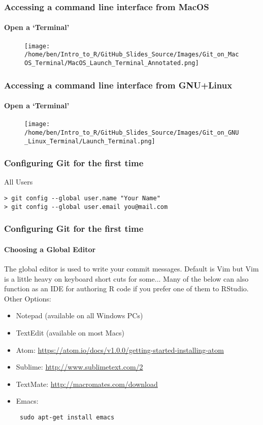 \documentclass[xcolor=dvipsnames]{beamer}
\begin{document}
\begin{frame}
\frametitle{Accessing a command line interface from MacOS}
\framesubtitle{Open a `Terminal'}
\begin{center}
\begin{figure}
\texttt{[image: /home/ben/Intro\_to\_R/GitHub\_Slides\_Source/Images/Git\_on\_MacOS\_Terminal/MacOS\_Launch\_Terminal\_Annotated.png]} 
\end{figure}
\end{center}
\end{frame}

\begin{frame}
\frametitle{Accessing a command line interface from GNU+Linux}
\framesubtitle{Open a `Terminal'}
\begin{center}
\begin{figure}
\texttt{[image: /home/ben/Intro\_to\_R/GitHub\_Slides\_Source/Images/Git\_on\_GNU\_Linux\_Terminal/Launch\_Terminal.png]}
\end{figure}
\end{center}
\end{frame}

\begin{frame}[fragile]
\frametitle{Configuring Git for the first time}
\begin{block}{All Users}
\begin{lstlisting}
> git config --global user.name "Your Name"
> git config --global user.email you@mail.com
\end{lstlisting}
\end{block}
\end{frame}

\begin{frame}[fragile]
\frametitle{Configuring Git for the first time}
\framesubtitle{Choosing a Global Editor}
The global editor is used to write your commit messages.
\newline
\newline
Default is Vim but Vim is a little heavy on keyboard short cuts for some...
\newline
\newline
Many of the below can also function as an IDE for authoring R code if you prefer one of them to RStudio.
\newline
\newline
Other Options: \begin{itemize}
\item Notepad (available on all Windows PCs)
\item TextEdit (available on most Macs)
\item Atom: \url{https://atom.io/docs/v1.0.0/getting-started-installing-atom}
\item Sublime: \url{http://www.sublimetext.com/2}
\item TextMate: \url{http://macromates.com/download}
\item Emacs: \begin{verbatim} sudo apt-get install emacs \end{verbatim} 
\end{itemize}

\end{frame}
\end{document}
